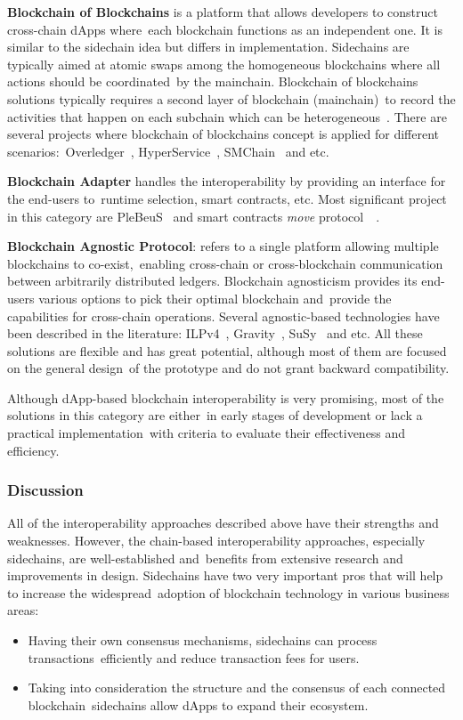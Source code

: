 \textbf{Blockchain of Blockchains} is a platform that allows developers to construct cross-chain dApps where\
each blockchain functions as an independent one.
It is similar to the sidechain idea but differs in implementation.
Sidechains are typically aimed at atomic swaps among the homogeneous blockchains where all actions should be coordinated\
by the mainchain.
Blockchain of blockchains solutions typically requires a second layer of blockchain (mainchain)\
to record the activities that happen on each subchain which can be heterogeneous~\cite{cryptoeprint:2021/537}.
There are several projects where blockchain of blockchains concept is applied for different scenarios:\
Overledger~\cite{Verdian2018}, HyperService~\cite{Liu2019}, SMChain~\cite{cryptoeprint:2019/1401} and etc.

\textbf{Blockchain Adapter} handles the interoperability by providing an interface for the end-users to\
runtime selection, smart contracts, etc.
Most significant project in this category are PleBeuS~\cite{Scheid2020} and smart contracts \emph{move} protocol\
~\cite{Fynn2020}.

\textbf{Blockchain Agnostic Protocol}: refers to a single platform allowing multiple blockchains to co-exist,\
enabling cross-chain or cross-blockchain communication between arbitrarily distributed ledgers.
Blockchain agnosticism provides its end-users various options to pick their optimal blockchain and\
provide the capabilities for cross-chain operations.
Several agnostic-based technologies have been described in the literature: ILPv4~\cite{InterledgerV4},
Gravity~\cite{PupyshevGravity2020}, SuSy~\cite{PupyshevSuSy2020} and etc.
All these solutions are flexible and has great potential, although most of them are focused on the general design\
of the prototype and do not grant backward compatibility.

Although dApp-based blockchain interoperability is very promising, most of the solutions in this category are either\
in early stages of development or lack a practical implementation\
with criteria to evaluate their effectiveness and efficiency.

\subsubsection{Discussion}

All of the interoperability approaches described above have their strengths and weaknesses.
However, the chain-based interoperability approaches, especially sidechains, are well-established and\
benefits from extensive research and improvements in design.
Sidechains have two very important pros that will help to increase the widespread\
adoption of blockchain technology in various business areas:
\begin{itemize}
    \item Having their own consensus mechanisms, sidechains can process transactions\
    efficiently and reduce transaction fees for users.
    \item Taking into consideration the structure and the consensus of each connected blockchain\
    sidechains allow dApps to expand their ecosystem.
\end{itemize}

